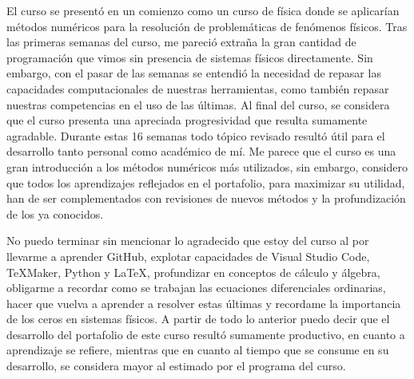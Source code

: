 \documentclass[../portafolio.tex]{subfiles}
\begin{document}
El curso se presentó en un comienzo como un curso de física donde se aplicarían métodos numéricos para la resolución de problemáticas de fenómenos físicos. Tras las primeras semanas del curso, me pareció extraña la gran cantidad de programación que vimos sin presencia de sistemas físicos directamente.  Sin embargo, con el pasar de las semanas se entendió la necesidad de repasar las capacidades computacionales de nuestras herramientas, como también repasar nuestras competencias en el uso de las últimas. Al final del curso, se considera que el curso presenta una apreciada progresividad que resulta sumamente agradable. Durante estas 16 semanas todo tópico revisado resultó útil para el desarrollo tanto personal como académico de mí. Me parece que el curso es una gran introducción a los métodos numéricos más utilizados, sin embargo, considero que todos los aprendizajes reflejados en el portafolio, para maximizar su utilidad, han de ser complementados con revisiones de nuevos métodos y la profundización de los ya conocidos. 


No puedo terminar sin mencionar lo agradecido que estoy del curso al por llevarme a aprender GitHub, explotar capacidades de Visual Studio Code, TeXMaker, Python y \LaTeX , profundizar en conceptos de cálculo y álgebra, obligarme a recordar como se trabajan las ecuaciones diferenciales ordinarias, hacer que vuelva a aprender a resolver estas últimas y recordame la importancia de los ceros en sistemas físicos. A partir de todo lo anterior puedo decir que el desarrollo del portafolio de este curso resultó sumamente productivo, en cuanto a aprendizaje se refiere, mientras que en cuanto al tiempo que se consume en su desarrollo, se considera mayor al estimado por el programa del curso.
\end{document}
